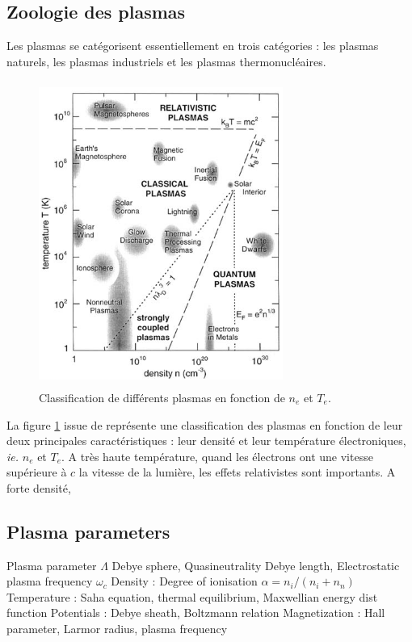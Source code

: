 		\subsection{Zoologie des plasmas}
			Les plasmas se catégorisent essentiellement en trois catégories : les plasmas
			naturels, les plasmas industriels et les plasmas thermonucléaires.
			\begin{figure}
				\centering
				\includegraphics[height=100mm,width=80mm]{figures/zoologie.png}{\caption{Classification
				de différents plasmas en fonction de $n_e$ et $T_e$.}\label{zoologie}}
			\end{figure}
			La figure \ref{zoologie} issue de \cite{national1995Plasma} représente une
			classification des plasmas en fonction de leur deux principales
			caractéristiques : leur densité et leur température électroniques, \emph{ie.}
			$n_e$ et $T_e$. A très haute température, quand les électrons
			ont une vitesse supérieure à $c$ la vitesse de la lumière, les effets
			relativistes sont importants. A forte densité, 
			
		\subsection{Plasma parameters}
		 Plasma parameter $\Lambda$ Debye sphere, Quasineutrality Debye length,
		Electrostatic plasma frequency $\omega_c$
		 Density : Degree of ionisation $\alpha=n_i/(n_i+n_n)$
			Temperature : Saha equation, thermal equilibrium, Maxwellian energy dist function
			Potentials : Debye sheath, Boltzmann relation
			Magnetization : Hall parameter, Larmor radius, plasma frequency
